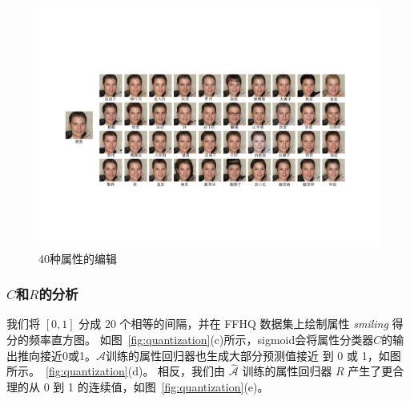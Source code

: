 \begin{figure}[!t]
    \begin{center}
       \includegraphics[width=0.9\linewidth]{figures/ACGAN/40Attributes.pdf}
    \end{center}
    \caption{40种属性的编辑}
    \label{fig:40Attributes}
\end{figure}

\subsubsection{$C$和$R$的分析}
我们将 $[0,1]$ 分成 20 个相等的间隔，并在 FFHQ 数据集上绘制属性 \textit{smiling} 得分的频率直方图。 如图~\ref{fig:quantization}(c)所示，sigmoid会将属性分类器$C$的输出推向接近0或1。$\mathcal{A}$训练的属性回归器也生成大部分预测值接近 到 0 或 1，如图所示。~\ref{fig:quantization}(d)。 相反，我们由 $\hat{\mathcal{A}}$ 训练的属性回归器 $R$ 产生了更合理的从 0 到 1 的连续值，如图~\ref{fig:quantization}(e)。 

